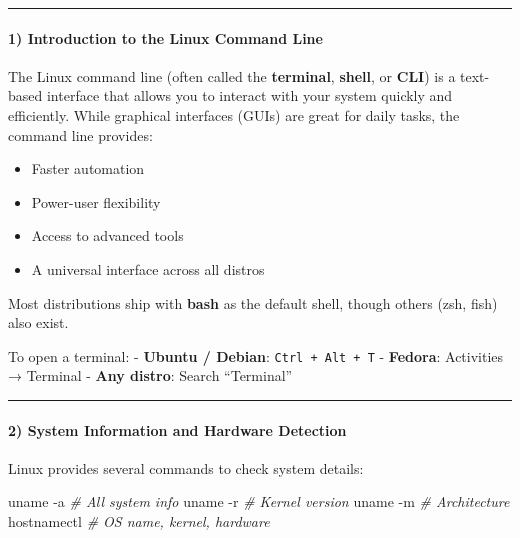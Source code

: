\documentclass[
  english,
  paper=a4,
  oneside  ,captions=tableheading
]{scrartcl}
\newenvironment{Shaded}{}{}
\newcommand{\AttributeTok}[1]{\textcolor[rgb]{0.49,0.56,0.16}{#1}}
\newcommand{\CommentTok}[1]{\textcolor[rgb]{0.38,0.63,0.69}{\textit{#1}}}
\newcommand{\ExtensionTok}[1]{#1}
\newcommand{\FunctionTok}[1]{\textcolor[rgb]{0.02,0.16,0.49}{#1}}
\providecommand{\tightlist}{%
  \setlength{\itemsep}{0pt}\setlength{\parskip}{0pt}}
\begin{document}
\begin{center}\rule{0.5\linewidth}{0.5pt}\end{center}

\paragraph{1) Introduction to the Linux Command
Line}\label{introduction-to-the-linux-command-line}

The Linux command line (often called the \textbf{terminal},
\textbf{shell}, or \textbf{CLI}) is a text-based interface that allows
you to interact with your system quickly and efficiently. While
graphical interfaces (GUIs) are great for daily tasks, the command line
provides:

\begin{itemize}
\tightlist
\item
  Faster automation
\item
  Power-user flexibility
\item
  Access to advanced tools
\item
  A universal interface across all distros
\end{itemize}

Most distributions ship with \textbf{bash} as the default shell, though
others (zsh, fish) also exist.

To open a terminal: - \textbf{Ubuntu / Debian}:
\texttt{Ctrl\ +\ Alt\ +\ T} - \textbf{Fedora}: Activities → Terminal -
\textbf{Any distro}: Search ``Terminal''

\begin{center}\rule{0.5\linewidth}{0.5pt}\end{center}

\paragraph{2) System Information and Hardware
Detection}\label{system-information-and-hardware-detection}

Linux provides several commands to check system details:

\begin{Shaded}
\begin{Highlighting}[]
\FunctionTok{uname} \AttributeTok{{-}a}        \CommentTok{\# All system info}
\FunctionTok{uname} \AttributeTok{{-}r}        \CommentTok{\# Kernel version}
\FunctionTok{uname} \AttributeTok{{-}m}        \CommentTok{\# Architecture}
\ExtensionTok{hostnamectl}     \CommentTok{\# OS name, kernel, hardware}
\end{Highlighting}
\end{Shaded}
\end{document}
